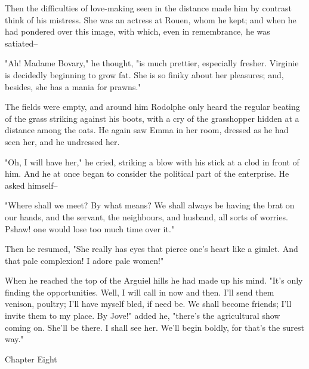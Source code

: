 \documentclass[11pt,twocolumn]{ltugboat}
\begin{document}
Then the difficulties of love-making seen in the distance made him by
contrast think of his mistress. She was an actress at Rouen, whom he
kept; and when he had pondered over this image, with which, even in
remembrance, he was satiated--

"Ah! Madame Bovary," he thought, "is much prettier, especially fresher.
Virginie is decidedly beginning to grow fat. She is so finiky about her
pleasures; and, besides, she has a mania for prawns."

The fields were empty, and around him Rodolphe only heard the regular
beating of the grass striking against his boots, with a cry of the
grasshopper hidden at a distance among the oats. He again saw Emma in
her room, dressed as he had seen her, and he undressed her.

"Oh, I will have her," he cried, striking a blow with his stick at a
clod in front of him. And he at once began to consider the political
part of the enterprise. He asked himself--

"Where shall we meet? By what means? We shall always be having the brat
on our hands, and the servant, the neighbours, and husband, all sorts of
worries. Pshaw! one would lose too much time over it."

Then he resumed, "She really has eyes that pierce one's heart like a
gimlet. And that pale complexion! I adore pale women!"

When he reached the top of the Arguiel hills he had made up his mind.
"It's only finding the opportunities. Well, I will call in now and then.
I'll send them venison, poultry; I'll have myself bled, if need be. We
shall become friends; I'll invite them to my place. By Jove!" added he,
"there's the agricultural show coming on. She'll be there. I shall see
her. We'll begin boldly, for that's the surest way."



Chapter Eight
\end{document}
